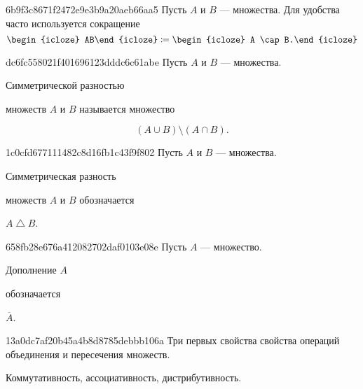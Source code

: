 \begin{note}{6b9f3c8671f2472e9e3b9a20aeb66aa5}
    Пусть \({ A }\) и \({ B }\) --- множества.
    Для удобства часто используется сокращение
    \[
        \begin{icloze}{2}AB\end{icloze} \coloneqq \begin{icloze}{1}A \cap B.\end{icloze}
    \]
\end{note}

\begin{note}{dc6fc558021f401696123dddc6c61abe}
    Пусть \({ A }\) и \({ B }\) --- множества.
    \begin{icloze}{2}Симметрической разностью\end{icloze} множеств \({ A }\) и \({ B }\) называется множество
    \begin{icloze}{1}
        \[
            (A \cup B) \setminus (A \cap B).
        \]
    \end{icloze}
\end{note}

\begin{note}{1c0cfd677111482c8d16fb1c43f9f802}
    Пусть \({ A }\) и \({ B }\) --- множества.
    \begin{icloze}{2}Симметрическая разность\end{icloze} множеств \({ A }\) и \({ B }\) обозначается \begin{icloze}{1}\({ A \bigtriangleup B }\).\end{icloze}
\end{note}

\begin{note}{658fb28e676a412082702daf0103e08e}
    Пусть \({ A }\) --- множество.
    \begin{icloze}{2}Дополнение \({ A }\)\end{icloze} обозначается \begin{icloze}{1}\({ \overline{A} }\).\end{icloze}
\end{note}

\begin{note}{13a0dc7af20b45a4b8d8785debbb106a}
    Три первых свойства свойства операций объединения и пересечения множеств.

    \begin{cloze}{1}
        Коммутативность, ассоциативность, дистрибутивность.
    \end{cloze}
\end{note}

